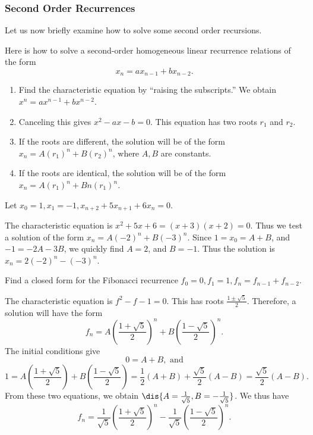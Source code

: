 \subsubsection{Second Order Recurrences} 
Let us now briefly examine how to solve some
second order recursions.

\begin{proc} 
Here is how to solve a second-order homogeneous
linear recurrence relations of the form
$$x_n = ax_{n - 1} + bx_{n - 2}.$$
\begin{enumerate}
\item Find the characteristic equation  by ``raising the
subscripts.'' We obtain $x^n = ax^{n - 1}  + bx^{n - 2}$.
\item
Canceling this gives $x^2 - ax - b = 0.$ This equation has two
roots $r_1$ and $r_2.$
\item If the roots are different, the
solution will be of the form $x_n = A(r_1)^n + B(r_2)^n$, where
$A, B$ are  constants. \item If the roots are identical, the
solution will be of the form $x_n = A(r_1)^n + Bn(r_1)^n$.
\end{enumerate}
\end{proc}

\begin{exa}
Let $x_0 = 1, x_1 = -1, x_{n + 2} + 5x_{n + 1} + 6x_n = 0$.
\begin{sol}  The characteristic equation is $x^2 + 5x + 6 = (x + 3)(x
+ 2) = 0$. Thus we test a solution of the form $x_n = A(-2)^n +
B(-3)^n.$ Since $1 = x_0 = A + B$, and $-1 = -2A - 3B$, we quickly find
$A = 2$, and $B = -1.$ Thus the solution is $x_{n} = 2(-2)^n -(-3)^n.$
\end{sol}
\end{exa}

\begin{exa}\label{exa:fibSol}
Find a closed form for the Fibonacci recurrence $f_0 = 0, f_1 = 1,
f_n = f_{n - 1} + f_{n - 2}$.
\begin{sol}  The characteristic equation is $f^2 - f - 1 = 0$.
This has roots $\frac{1 \pm \sqrt{5}}{2}$.
Therefore, a solution will have the form $${f_n = A\left(\frac{1 +
\sqrt{5}}{2}\right)^n + B\left(\frac{1 - \sqrt{5}}{2}\right)^n}.$$
The initial conditions give
$$0 = A + B, \mbox{ and}$$
$$1 = A\left(\frac{1 + \sqrt{5}}{2}\right) + B\left(\frac{1 - \sqrt{5}}{2}\right)
= \frac{1}{2}\left(A + B\right) + \frac{\sqrt{5}}{2}\left(A -
B\right) = \frac{\sqrt{5}}{2}\left(A - B\right).$$ 
From these two equations, we obtain
$\dis{A = \frac{1}{\sqrt{5}}, B = -\frac{1}{\sqrt{5}}}$. 
We thus have 
$$
f_n = \frac{1}{\sqrt{5}}\left(\frac{1 + \sqrt{5}}{2}\right)^n -
\frac{1}{\sqrt{5}}\left(\frac{1 - \sqrt{5}}{2}\right)^n.
$$
\end{sol}
\end{exa}


